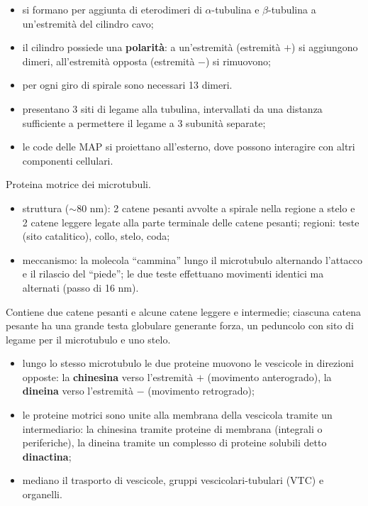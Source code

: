 \begin{itemize}
  \item si formano per aggiunta di eterodimeri di $\alpha$-tubulina e $\beta$-tubulina a un'estremità del cilindro cavo;
  \item il cilindro possiede una \textbf{polarità}: a un'estremità (estremità $+$) si aggiungono dimeri, all'estremità opposta (estremità $-$) si rimuovono;
  \item per ogni giro di spirale sono necessari 13 dimeri.
\end{itemize}

\begin{itemize}
  \item presentano 3 siti di legame alla tubulina, intervallati da una distanza sufficiente a permettere il legame a 3 subunità separate;
  \item le code delle MAP si proiettano all'esterno, dove possono interagire con altri componenti cellulari.
\end{itemize}

Proteina motrice dei microtubuli.
\begin{itemize}
  \item struttura ($\sim$80 nm): 2 catene pesanti avvolte a spirale nella regione a stelo e 2 catene leggere legate alla parte terminale delle catene pesanti; regioni: teste (sito catalitico), collo, stelo, coda;
  \item meccanismo: la molecola ``cammina'' lungo il microtubulo alternando l'attacco e il rilascio del ``piede''; le due teste effettuano movimenti identici ma alternati (passo di 16 nm).
\end{itemize}

Contiene due catene pesanti e alcune catene leggere e intermedie; ciascuna catena pesante ha una grande testa globulare generante forza, un peduncolo con sito di legame per il microtubulo e uno stelo.
\begin{itemize}
  \item lungo lo stesso microtubulo le due proteine muovono le vescicole in direzioni opposte: la \textbf{chinesina} verso l'estremità $+$ (movimento anterogrado), la \textbf{dineina} verso l'estremità $-$ (movimento retrogrado);
  \item le proteine motrici sono unite alla membrana della vescicola tramite un intermediario: la chinesina tramite proteine di membrana (integrali o periferiche), la dineina tramite un complesso di proteine solubili detto \textbf{dinactina};
  \item mediano il trasporto di vescicole, gruppi vescicolari-tubulari (VTC) e organelli.
\end{itemize}

